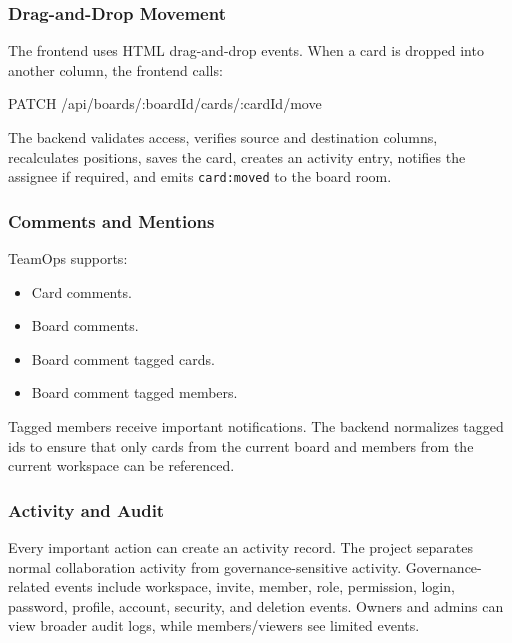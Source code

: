 \documentclass[
]{article}
\newenvironment{Shaded}{}{}
\newcommand{\NormalTok}[1]{#1}
\providecommand{\tightlist}{%
  \setlength{\itemsep}{0pt}\setlength{\parskip}{0pt}}
\begin{document}
\subsubsection{Drag-and-Drop Movement}\label{drag-and-drop-movement}

The frontend uses HTML drag-and-drop events. When a card is dropped into
another column, the frontend calls:

\begin{Shaded}
\begin{Highlighting}[]
\NormalTok{PATCH /api/boards/:boardId/cards/:cardId/move}
\end{Highlighting}
\end{Shaded}

The backend validates access, verifies source and destination columns,
recalculates positions, saves the card, creates an activity entry,
notifies the assignee if required, and emits \texttt{card:moved} to the
board room.

\subsubsection{Comments and Mentions}\label{comments-and-mentions}

TeamOps supports:

\begin{itemize}
\tightlist
\item
  Card comments.
\item
  Board comments.
\item
  Board comment tagged cards.
\item
  Board comment tagged members.
\end{itemize}

Tagged members receive important notifications. The backend normalizes
tagged ids to ensure that only cards from the current board and members
from the current workspace can be referenced.

\subsubsection{Activity and Audit}\label{activity-and-audit}

Every important action can create an activity record. The project
separates normal collaboration activity from governance-sensitive
activity. Governance-related events include workspace, invite, member,
role, permission, login, password, profile, account, security, and
deletion events. Owners and admins can view broader audit logs, while
members/viewers see limited events.
\end{document}
